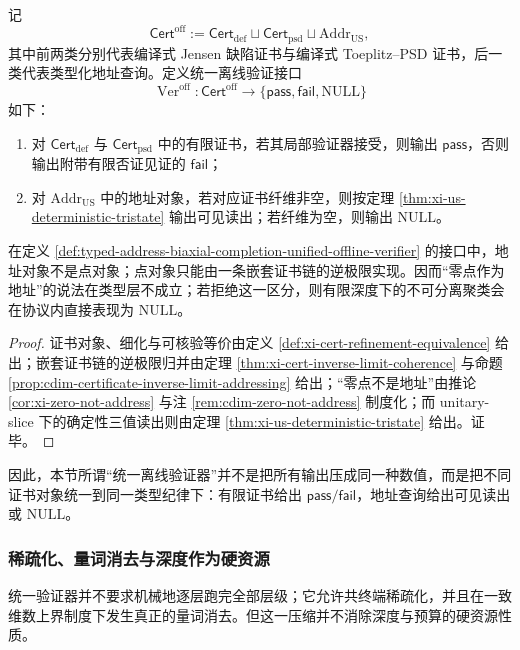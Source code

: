\begin{definition}[统一离线验证接口]\label{def:typed-address-biaxial-completion-unified-offline-verifier}
记
\[
\mathsf{Cert}^{\mathrm{off}}
:=
\mathsf{Cert}_{\mathrm{def}}
\sqcup
\mathsf{Cert}_{\mathrm{psd}}
\sqcup
\mathrm{Addr}_{\mathrm{US}},
\]
其中前两类分别代表编译式 Jensen 缺陷证书与编译式 Toeplitz--PSD 证书，后一类代表类型化地址查询。定义统一离线验证接口
\[
\operatorname{Ver}^{\mathrm{off}}:\mathsf{Cert}^{\mathrm{off}}\longrightarrow \{\mathsf{pass},\mathsf{fail},\mathrm{NULL}\}
\]
如下：
\begin{enumerate}
  \item 对 \(\mathsf{Cert}_{\mathrm{def}}\) 与 \(\mathsf{Cert}_{\mathrm{psd}}\) 中的有限证书，若其局部验证器接受，则输出 \(\mathsf{pass}\)，否则输出附带有限否证见证的 \(\mathsf{fail}\)；
  \item 对 \(\mathrm{Addr}_{\mathrm{US}}\) 中的地址对象，若对应证书纤维非空，则按定理 \ref{thm:xi-us-deterministic-tristate} 输出可见读出；若纤维为空，则输出 \(\mathrm{NULL}\)。
\end{enumerate}
\end{definition}

\begin{proposition}[地址对象与点对象的类型分离]\label{prop:typed-address-biaxial-completion-address-not-point}
在定义 \ref{def:typed-address-biaxial-completion-unified-offline-verifier} 的接口中，地址对象不是点对象；点对象只能由一条嵌套证书链的逆极限实现。因而“零点作为地址”的说法在类型层不成立；若拒绝这一区分，则有限深度下的不可分离聚类会在协议内直接表现为 \(\mathrm{NULL}\)。
\end{proposition}
\begin{proof}
证书对象、细化与可核验等价由定义 \ref{def:xi-cert-refinement-equivalence} 给出；嵌套证书链的逆极限归并由定理 \ref{thm:xi-cert-inverse-limit-coherence} 与命题 \ref{prop:cdim-certificate-inverse-limit-addressing} 给出；“零点不是地址”由推论 \ref{cor:xi-zero-not-address} 与注 \ref{rem:cdim-zero-not-address} 制度化；而 unitary-slice 下的确定性三值读出则由定理 \ref{thm:xi-us-deterministic-tristate} 给出。证毕。
\end{proof}

因此，本节所谓“统一离线验证器”并不是把所有输出压成同一种数值，而是把不同证书对象统一到同一类型纪律下：有限证书给出 \(\mathsf{pass}/\mathsf{fail}\)，地址查询给出可见读出或 \(\mathrm{NULL}\)。

\subsubsection{稀疏化、量词消去与深度作为硬资源}\label{subsubsec:typed-address-biaxial-completion-sparsification-depth}
统一验证器并不要求机械地逐层跑完全部层级；它允许共终端稀疏化，并且在一致维数上界制度下发生真正的量词消去。但这一压缩并不消除深度与预算的硬资源性质。

